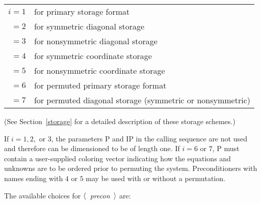 \bigskip
\begin{tabular}{rl}
        $i = 1$ & for primary storage format  \\
        $  = 2$ & for symmetric diagonal storage        \\
        $  = 3$ & for nonsymmetric diagonal storage     \\
        $  = 4$ & for symmetric coordinate storage      \\
        $  = 5$ & for nonsymmetric coordinate storage   \\
        $  = 6$ & for permuted primary storage format   \\
        $  = 7$ & for permuted diagonal storage (symmetric
                    or nonsymmetric)
\end{tabular}
 
\bigskip
\noindent
(See Section~\ref{storage} for a detailed description of these
storage schemes.)

If $i = 1,2,$ or $3$, the parameters P and IP in the calling sequence
are not used and therefore can be dimensioned to be of length one.
If $i=6$ or $7$, P must contain a user-supplied coloring vector
indicating how the equations and unknowns are to be ordered prior
to permuting the system.  Preconditioners with names ending with
$4$ or $5$ may be used with or without a permutation.
 
    The available choices for
$\langle$~{\em precon}~$\rangle$ are:
 
